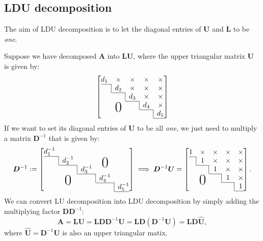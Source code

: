 \subsection{LDU decomposition}
The aim of LDU decomposition is to let the diagonal entries of $\bm U$ and $\bm L$ to be \emph{one}.

Suppose we have decomposed $\bm A$ into $\bm{LU}$, where the upper triangular matrix $\bm U$ is given by:
\[
\left[
    \begin{array}{@{}ccccc@{}}
    d_1    & \x       & \x    & \x    & \x \\ \cline{1-1}
    \bord & d_2       & \x    & \x    & \x \\ \cline{2-2}
          & \bord    & d_3    & \x    & \x \\ \cline{3-3}
          & \bigzero & \bord & d_4    & \x \\ \cline{4-4}
          &          &       & \bord & d_5 \\ \cline{5-5}
  \end{array}\right]
\]
If we want to set its diagonal entries of $\bm U$ to be all \emph{one}, we just need to multiply a matrix $\bm D^{-1}$ that is
given by:
\[
\bm D^{-1}:=
\left[
    \begin{array}{@{}ccccc@{}}
    d_1^{-1}    &        &     &     &  \\ \cline{1-1}
    \bord & d_2^{-1}       &    &  \bigzero   &  \\ \cline{2-2}
          & \bord    & d_3^{-1}    &     &  \\ \cline{3-3}
          & \bigzero & \bord & d_4^{-1}    &  \\ \cline{4-4}
          &          &       & \bord & d_5^{-1} \\ \cline{5-5}
  \end{array}\right]
\implies
\bm D^{-1}\bm U=
\left[
    \begin{array}{@{}ccccc@{}}
    1    & \x       & \x    & \x    & \x \\ \cline{1-1}
    \bord & 1       & \x    & \x    & \x \\ \cline{2-2}
          & \bord    & 1    & \x    & \x \\ \cline{3-3}
          & \bigzero & \bord & 1    & \x \\ \cline{4-4}
          &          &       & \bord & 1 \\ \cline{5-5}
  \end{array}\right].
\]
We can convert LU decomposition into LDU decomposition by simply adding the multiplying factor $\bm D\bm D^{-1}$:
\[
\bm A=\bm L\bm U=\bm L\bm D\bm D^{-1}\bm U
=\bm L\bm D(\bm D^{-1}\bm U)
=\bm L\bm D\hat{\bm U},
\]
where $\hat{\bm U}=\bm D^{-1}\bm U$ is also an upper triangular matix.

